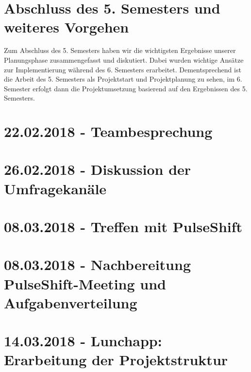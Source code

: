 \section{Abschluss des 5. Semesters und weiteres Vorgehen}
Zum Abschluss des 5. Semesters haben wir die wichtigsten Ergebnisse unserer Planungsphase zusammengefasst und diskutiert. Dabei wurden wichtige Ansätze zur Implementierung während des 6. Semesters erarbeitet. Dementsprechend ist die Arbeit des 5. Semesters als Projektstart und Projektplanung zu sehen, im 6. Semester erfolgt dann die Projektumsetzung basierend auf den Ergebnissen des 5. Semesters.

\section{22.02.2018 - Teambesprechung}

\section{26.02.2018 - Diskussion der Umfragekanäle}

\section{08.03.2018 - Treffen mit PulseShift}

\section{08.03.2018 - Nachbereitung PulseShift-Meeting und Aufgabenverteilung}

\section{14.03.2018 - Lunchapp: Erarbeitung der Projektstruktur}